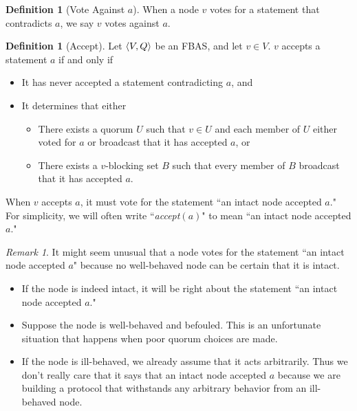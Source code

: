 \documentclass[12pt, psamsfonts]{amsart}
\theoremstyle{definition}
\newtheorem{defn}[thm]{Definition}
\theoremstyle{remark}
\newtheorem{rem}[thm]{Remark}
\numberwithin{equation}{subsection}
\begin{document}
\begin{defn}[Vote Against $a$]\label{def_vote_against_a}
    When a node $v$ votes for a statement that contradicts $a$, we say $v$ votes against $a$.
\end{defn}

\begin{defn}[Accept]\label{def_accept}
    Let $\ev{V, Q}$ be an FBAS\@, and let $v \in V$.
    $v$ accepts a statement $a$ if and only if 
    \begin{itemize}
        \item
            It has never accepted a statement contradicting $a$, and
        \item
            It determines that either
            \begin{itemize}
                \item
                    There exists a quorum $U$ such that $v \in U$ and each member of $U$ either voted for $a$ or broadcast that it has accepted $a$, or
                \item
                    There exists a $v$-blocking set $B$ such that every member of $B$ broadcast that it has accepted $a$.
            \end{itemize}
    \end{itemize}

    When $v$ accepts $a$, it must vote for the statement ``an intact node accepted $a$."
    For simplicity, we will often write ``\textit{accept}$(a)$" to mean ``an intact node accepted $a$."
\end{defn}

\begin{rem}
    It might seem unusual that a node votes for the statement ``an intact node accepted $a$" because no well-behaved node can be certain that it is intact.
    \begin{itemize}
        \item
            If the node is indeed intact, it will be right about the statement ``an intact node accepted $a$."
        \item
            Suppose the node is well-behaved and befouled.
            This is an unfortunate situation that happens when poor quorum choices are made.
        \item
            If the node is ill-behaved, we already assume that it acts arbitrarily.
            Thus we don't really care that it says that an intact node accepted $a$ because we are building a protocol that withstands any arbitrary behavior from an ill-behaved node.
    \end{itemize}
\end{rem}
\end{document}
